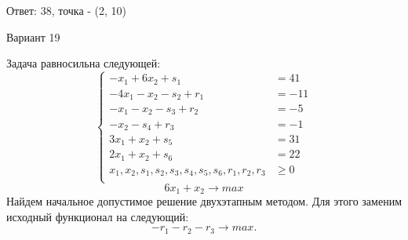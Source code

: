 \documentclass{article}%
\begin{document}
\begin{flushright}%
Ответ: 38, точка {-} (2, 10)%
\end{flushright}%
\newpage%
\begin{center}%
\begin{Huge}%
Вариант 19%
\end{Huge}%
\end{center}%
Задача равносильна следующей: %
\[%
\left\{\begin{aligned}-x_{1}+6x_{2}+s_{1} & =41 \\-4x_{1}-x_{2}-s_{2}+r_{1} & =-11 \\-x_{1}-x_{2}-s_{3}+r_{2} & =-5 \\-x_{2}-s_{4}+r_{3} & =-1 \\3x_{1}+x_{2}+s_{5} & =31 \\2x_{1}+x_{2}+s_{6} & =22 \\x_{1},x_{2},s_{1},s_{2},s_{3},s_{4},s_{5},s_{6},r_{1},r_{2},r_{3} & \ge 0 \\ \end{aligned}\right.%
\]%
\[%
6x_{1}+x_{2}  \to max%
\]%
Найдем начальное допустимое решение двухэтапным методом. Для этого заменим исходный функционал на следующий: %
\[%
-r_{1}-r_{2}-r_{3}\to max.%
\]%
\end{document}
